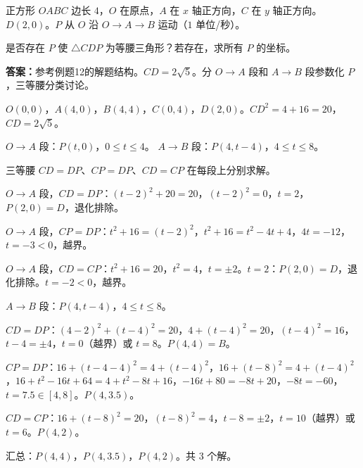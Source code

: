 \documentclass{exam-zh}
\newcommand{\answerarea}[1][40mm]{%
  \vspace{2mm}%
  \begin{tcolorbox}[
    enhanced, breakable,
    colback=white,
    colframe=white,
    boxrule=0pt,
    height=#1,
    valign=top,
    bottom=0mm,
    after skip=0mm,
  ]
  \end{tcolorbox}%
}
\newcounter{solstep}
\begin{document}

\begin{problem}[points=10]
  正方形 $OABC$ 边长 $4$，$O$ 在原点，$A$ 在 $x$ 轴正方向，$C$ 在 $y$ 轴正方向。$D(2,0)$。$P$ 从 $O$ 沿 $O \to A \to B$ 运动（$1$ 单位/秒）。

是否存在 $P$ 使 $\triangle CDP$ 为等腰三角形？若存在，求所有 $P$ 的坐标。
  \answerarea[80mm]
  \setcounter{solstep}{0}
  \begin{solutionblock}
    \textbf{答案：}参考例题12的解题结构。$CD=2\sqrt{5}$。分 $O\to A$ 段和 $A\to B$ 段参数化 $P$，三等腰分类讨论。\par\medskip
    $O(0,0)$，$A(4,0)$，$B(4,4)$，$C(0,4)$，$D(2,0)$。$CD^2=4+16=20$，$CD=2\sqrt{5}$。

$O\to A$ 段：$P(t,0)$，$0\leq t\leq 4$。
$A\to B$ 段：$P(4,t-4)$，$4\leq t\leq 8$。

三等腰 $CD=DP$、$CP=DP$、$CD=CP$ 在每段上分别求解。

$O\to A$ 段，$CD=DP$：$(t-2)^2+20=20$，$(t-2)^2=0$，$t=2$，$P(2,0)=D$，退化排除。

$O\to A$ 段，$CP=DP$：$t^2+16=(t-2)^2$，$t^2+16=t^2-4t+4$，$4t=-12$，$t=-3<0$，越界。

$O\to A$ 段，$CD=CP$：$t^2+16=20$，$t^2=4$，$t=\pm 2$。$t=2$：$P(2,0)=D$，退化排除。$t=-2<0$，越界。

$A\to B$ 段：$P(4,t-4)$，$4\leq t\leq 8$。

$CD=DP$：$(4-2)^2+(t-4)^2=20$，$4+(t-4)^2=20$，$(t-4)^2=16$，$t-4=\pm 4$，$t=0$（越界）或 $t=8$。$P(4,4)=B$。

$CP=DP$：$16+(t-4-4)^2=4+(t-4)^2$，$16+(t-8)^2=4+(t-4)^2$，$16+t^2-16t+64=4+t^2-8t+16$，$-16t+80=-8t+20$，$-8t=-60$，$t=7.5 \in [4,8]$。$P(4,3.5)$。

$CD=CP$：$16+(t-8)^2=20$，$(t-8)^2=4$，$t-8=\pm 2$，$t=10$（越界）或 $t=6$。$P(4,2)$。

汇总：$P(4,4)$，$P(4,3.5)$，$P(4,2)$。共 $3$ 个解。
  \end{solutionblock}
\end{problem}


\end{document}
